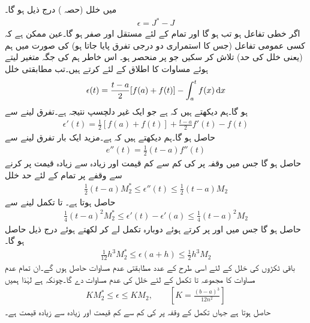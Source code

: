  میں خلل (حصہ )  درج ذیل ہو گا۔
\begin{align*}
\epsilon=J^*-J
\end{align*}
اگر  خطی تفاعل ہو تب  ہو گا اور تمام  کے لئے   مستقل اور  صفر ہو گا۔عین ممکن ہے کہ کسی عمومی تفاعل  (جس کا استمراری دو درجی تفرق پایا جاتا ہو)  کی صورت میں ہم   (یعنی خلل  کی حد) تلاش کر سکیں جو  پر منحصر ہو۔ اس خاطر ہم  کی جگہ متغیر  لیتے ہوئے  مساوات  کا اطلاق  کے لئے کرتے ہیں۔تب مطابقتی خلل
\begin{align*}
\epsilon(t)=\frac{t-a}{2}[f(a)+f(t)]-\int_a^t f(x)\dif x
\end{align*}
ہو گا۔ہم دیکھتے ہیں کہ  ہے جو ایک غیر دلچسپ نتیجہ ہے۔تفرق لینے سے
\begin{align*}
\epsilon'(t)=\frac{1}{2}[f(a)+f(t)]+\frac{t-a}{2}f'(t)-f(t)
\end{align*}
حاصل ہو گا۔ہم دیکھتے ہیں کہ  ہے۔مزید ایک بار تفرق لینے سے
\begin{align*}
e''(t)=\frac{1}{2}(t-a)f''(t)
\end{align*}
حاصل ہو گا جس میں وقفہ  پر  کی کم سے کم قیمت   اور زیادہ سے زیادہ قیمت   پر کرنے سے وقفے پر تمام  کے لئے  حد خلل
\begin{align*}
\frac{1}{2}(t-a)M_2^*\le \epsilon''(t)\le \frac{1}{2}(t-a)M_2
\end{align*}
حاصل ہوتا ہے۔ تا  تکمل لینے سے
\begin{align*}
\frac{1}{4}(t-a)^2M_2^*\le \epsilon'(t)-\epsilon'(a)\le \frac{1}{4}(t-a)^2M_2
\end{align*}
حاصل ہو گا جس میں  اور  پر کرتے ہوئے دوبارہ تکمل لے کر  لکھتے ہوئے درج ذیل حاصل ہو گا۔
\begin{align*}
\frac{1}{12}h^3M_2^*\le \epsilon(a+h)\le \frac{1}{2}h^3M_2
\end{align*}
باقی  ٹکڑوں کی خلل کے لئے اسی طرح کے  عدد مطابقتی عدم مساوات  حاصل ہوں گے۔ان تمام  عدم مساوات کا مجموعہ  تا  تکمل کے لئے خلل  کی عدم مساوات دے گا۔چونکہ  ہے لہٰذا ہمیں
\begin{align}\label{مساوات_اعدادی_حد_خلل}
KM_2^*\le \epsilon\le KM_2,\quad \quad [K=\tfrac{(b-a)^3}{12n^2}]
\end{align}
حاصل ہوتا ہے جہاں تکمل کے  وقفہ پر  کی کم سے کم قیمت  اور زیادہ سے زیادہ قیمت  ہے۔

